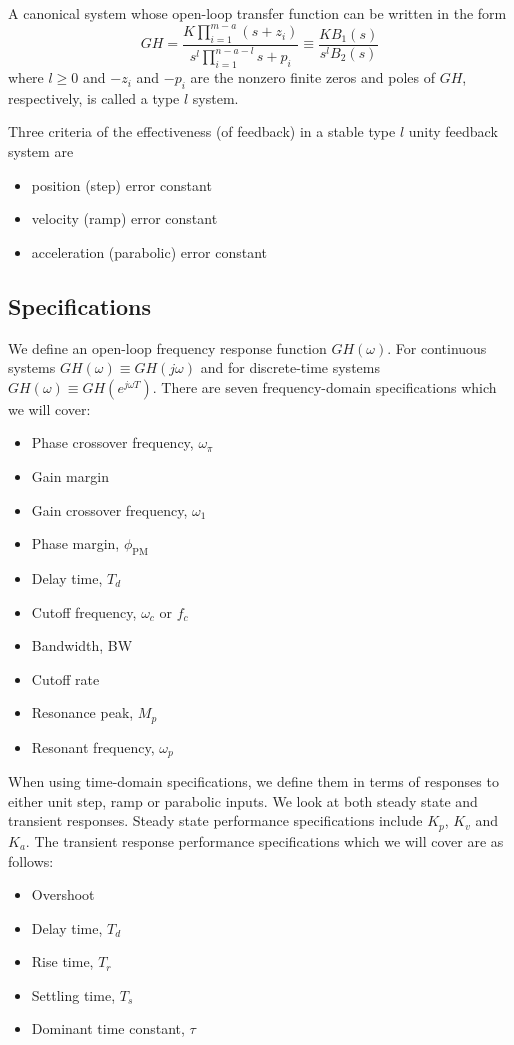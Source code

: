 \documentclass[11pt]{book}
\theoremstyle{example}
\begin{document}
A canonical system whose open-loop transfer function can be written in the form
\begin{equation}
	GH=\frac{K\prod_{i=1}^{m-a}{(s+z_i)}}{s^l\prod_{i=1}^{n-a-l}{s+p_i}}\equiv\frac{KB_1(s)}{s^lB_2(s)}
\end{equation}
where $l\geq{0}$ and $-z_i$ and $-p_i$ are the nonzero finite zeros and poles of $GH$, respectively, is called a type $l$ system.

Three criteria of the effectiveness (of feedback) in a stable type $l$ unity feedback system are
\begin{itemize}
	\item position (step) error constant
	\item velocity (ramp) error constant
	\item acceleration (parabolic) error constant
\end{itemize}

\subsection{Specifications}

We define an open-loop frequency response function $GH(\omega)$. For continuous systems $GH(\omega)\equiv{GH(j\omega)}$ and for discrete-time systems $GH(\omega)\equiv{GH(e^{j\omega{T}})}$. There are seven frequency-domain specifications which we will cover:
\begin{itemize}
	\item Phase crossover frequency, $\omega_\pi$
	\item Gain margin
	\item Gain crossover frequency, $\omega_\mathrm{1}$
	\item Phase margin, $\phi_\mathrm{PM}$
	\item Delay time, $T_d$
	\item Cutoff frequency, $\omega_c$ or $f_c$
	\item Bandwidth, BW
	\item Cutoff rate
	\item Resonance peak, $M_p$
	\item Resonant frequency, $\omega_p$
\end{itemize}

When using time-domain specifications, we define them in terms of responses to either unit step, ramp or parabolic inputs. We look at both steady state and transient responses. Steady state performance specifications include $K_p$, $K_v$ and $K_a$. The transient response performance specifications which we will cover are as follows:
\begin{itemize}
	\item Overshoot
	\item Delay time, $T_d$
	\item Rise time, $T_r$
	\item Settling time, $T_s$
	\item Dominant time constant, $\tau$
\end{itemize}
\end{document}
